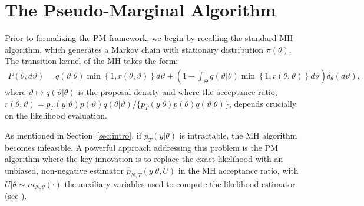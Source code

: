 \documentclass[pdflatex,sn-mathphys-num]{sn-jnl}
\theoremstyle{thmstyleone}
\theoremstyle{thmstyletwo}
\theoremstyle{thmstylethree}
\begin{document}
\section{The Pseudo-Marginal Algorithm}
\label{sec:pm}
Prior to formalizing the PM framework, we begin by recalling the standard MH algorithm, which generates a Markov chain with stationary distribution $\pi(\theta)$. The transition kernel of the MH takes the form:
\begin{align*}
P(\theta, d\vartheta) = q(\vartheta|\theta)\min\left\{1,r(\theta,\vartheta)\right\}d\vartheta + \left(1-\int_\Theta q(\vartheta|\theta)\min\left\{1,r(\theta,\vartheta)\right\}d\vartheta\right)\delta_\theta(d\vartheta),
\end{align*}
where $\vartheta \mapsto q(\vartheta|\theta)$ is the proposal density and where the acceptance ratio, $r(\theta,\vartheta)={p_T(y|\vartheta)p(\vartheta)q(\theta|\vartheta)}/\{p_T(y|\theta)p(\theta)q(\vartheta|\theta)\} \label{MHratio}$, depends crucially on the likelihood evaluation. 

As mentioned in Section~\ref{sec:intro}, if \(p_T(y|\theta) \) is intractable, the MH algorithm becomes infeasible. A powerful approach addressing this problem is the PM algorithm where the key innovation is to replace the exact likelihood with an unbiased, non-negative estimator $\widehat{p}_{N,T}(y|\theta,U)$ in the MH acceptance ratio, with $U|\theta \sim m_{N,\theta}(\cdot)$ the auxiliary variables used to compute the likelihood estimator (see \cite{lin_noisy_2000, beaumont_estimation_2003, andrieu_pseudo-marginal_2009}). 
\end{document}

